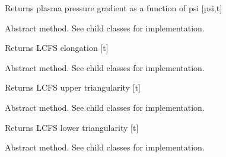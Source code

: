 \documentclass[letterpaper,10pt,english]{sphinxmanual}
\begin{document}
\begin{fulllineitems}
\begin{fulllineitems}
Returns plasma pressure gradient as a function of psi {[}psi,t{]}

\end{fulllineitems}


\begin{fulllineitems}
\label{\detokenize{eqtools:eqtools.core.Equilibrium.getElongation}}
Abstract method.  See child classes for implementation.

Returns LCFS elongation {[}t{]}

\end{fulllineitems}


\begin{fulllineitems}
\label{\detokenize{eqtools:eqtools.core.Equilibrium.getUpperTriangularity}}
Abstract method.  See child classes for implementation.

Returns LCFS upper triangularity {[}t{]}

\end{fulllineitems}


\begin{fulllineitems}
\label{\detokenize{eqtools:eqtools.core.Equilibrium.getLowerTriangularity}}
Abstract method.  See child classes for implementation.

Returns LCFS lower triangularity {[}t{]}

\end{fulllineitems}


\begin{fulllineitems}
\label{\detokenize{eqtools:eqtools.core.Equilibrium.getShaping}}
Abstract method.  See child classes for implementation.


\end{fulllineitems}
\end{fulllineitems}
\end{document}

